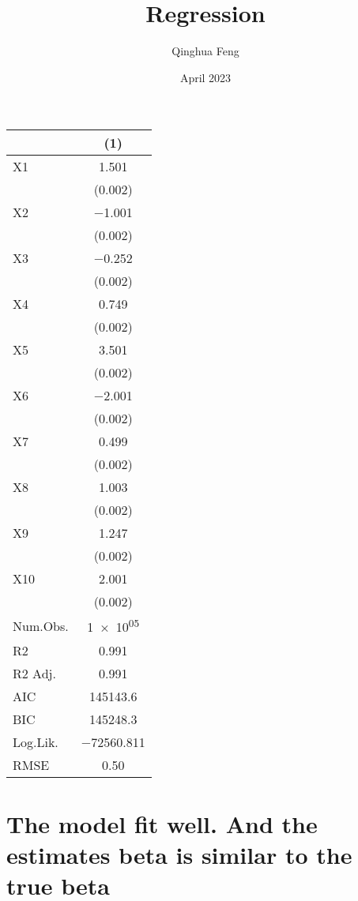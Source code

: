 \documentclass{article}
\title{Regression}
\author{Qinghua Feng }
\date{April 2023}
\begin{document}
\begin{table}
\centering
\begin{tabular}[t]{lc}
\toprule
  & (1)\\
\midrule
X1 & \num{1.501}\\
 & \vphantom{9} (\num{0.002})\\
X2 & \num{-1.001}\\
 & \vphantom{8} (\num{0.002})\\
X3 & \num{-0.252}\\
 & \vphantom{7} (\num{0.002})\\
X4 & \num{0.749}\\
 & \vphantom{6} (\num{0.002})\\
X5 & \num{3.501}\\
 & \vphantom{5} (\num{0.002})\\
X6 & \num{-2.001}\\
 & \vphantom{4} (\num{0.002})\\
X7 & \num{0.499}\\
 & \vphantom{3} (\num{0.002})\\
X8 & \num{1.003}\\
 & \vphantom{2} (\num{0.002})\\
X9 & \num{1.247}\\
 & \vphantom{1} (\num{0.002})\\
X10 & \num{2.001}\\
 & (\num{0.002})\\
\midrule
Num.Obs. & \num{1e+05}\\
R2 & \num{0.991}\\
R2 Adj. & \num{0.991}\\
AIC & \num{145143.6}\\
BIC & \num{145248.3}\\
Log.Lik. & \num{-72560.811}\\
RMSE & \num{0.50}\\
\bottomrule
\end{tabular}
\end{table}

\section{The model fit well. And the estimates beta is similar to the true beta}
\end{document}
